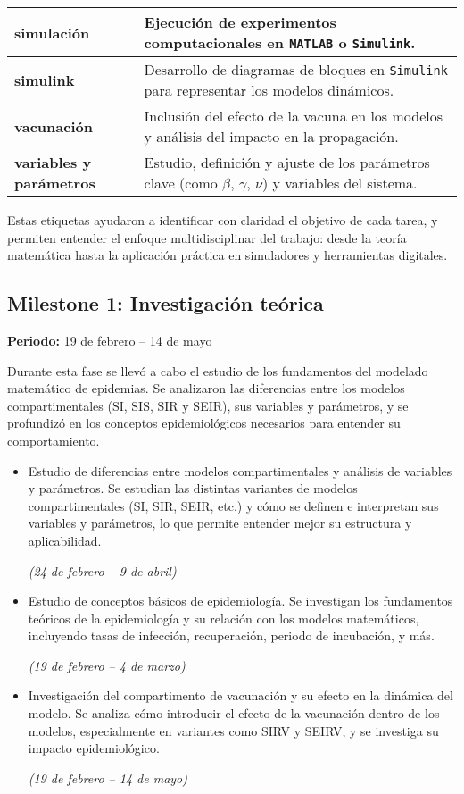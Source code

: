 \begin{table}[H]
\begin{tabular}{|p{4cm}|p{10cm}|}
    \hline
    \textbf{simulación} & Ejecución de experimentos computacionales en \texttt{MATLAB} o \texttt{Simulink}. \\
    \hline
    \textbf{simulink} & Desarrollo de diagramas de bloques en \texttt{Simulink} para representar los modelos dinámicos. \\
    \hline
    \textbf{vacunación} & Inclusión del efecto de la vacuna en los modelos y análisis del impacto en la propagación. \\
    \hline
    \textbf{variables y parámetros} & Estudio, definición y ajuste de los parámetros clave (como $\beta$, $\gamma$, $\nu$) y variables del sistema. \\
    \hline
    \end{tabular}
\end{table}
Estas etiquetas ayudaron a identificar con claridad el objetivo de cada tarea, y permiten entender el enfoque multidisciplinar del trabajo: desde la teoría matemática hasta la aplicación práctica en simuladores y herramientas digitales.




\subsection{Milestone 1: Investigación teórica}
\textbf{Periodo:} 19 de febrero – 14 de mayo

Durante esta fase se llevó a cabo el estudio de los fundamentos del modelado matemático de epidemias. Se analizaron las diferencias entre los modelos compartimentales (SI, SIS, SIR y SEIR), sus variables y parámetros, y se profundizó en los conceptos epidemiológicos necesarios para entender su comportamiento.

\begin{itemize}
    \item Estudio de diferencias entre modelos compartimentales y análisis de variables y parámetros. Se estudian las distintas variantes de modelos compartimentales (SI, SIR, SEIR, etc.) y cómo se definen e interpretan sus variables y parámetros, lo que permite entender mejor su estructura y aplicabilidad. 
    
    \textit{(24 de febrero – 9 de abril)}
    \item Estudio de conceptos básicos de epidemiología. Se investigan los fundamentos teóricos de la epidemiología y su relación con los modelos matemáticos, incluyendo tasas de infección, recuperación, periodo de incubación, y más. 
    
    \textit{(19 de febrero – 4 de marzo)}
    \item Investigación del compartimento de vacunación y su efecto en la dinámica del modelo. Se analiza cómo introducir el efecto de la vacunación dentro de los modelos, especialmente en variantes como SIRV y SEIRV, y se investiga su impacto epidemiológico. 
    
    \textit{(19 de febrero – 14 de mayo)}
\end{itemize}

